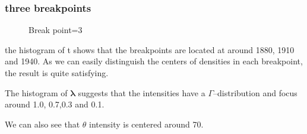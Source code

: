 \documentclass{article}
\begin{document}
\subsubsection{three breakpoints}
\begin{figure}[H]
    \centering
    \caption{Break point=3}
\end{figure}

the histogram of t shows that the breakpoints are located at around 1880, 1910 and 1940. As we can easily distinguish the centers of densities in each breakpoint, the result is quite satisfying.

The histogram of $\boldsymbol{\lambda}$ suggests that the intensities have a $\Gamma$–distribution and focus around 1.0, 0.7,0.3 and 0.1.

We can also see that $\theta$ intensity is centered around 70.
\end{document}
